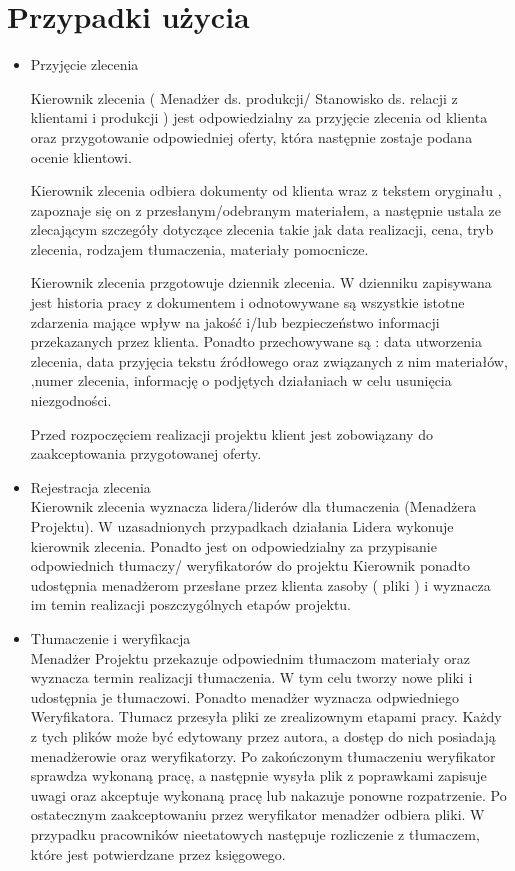 \documentclass[licencjacka]{pracamgr}
\begin{document}
\section{Przypadki użycia}
\begin{itemize} 
\item Przyjęcie zlecenia

Kierownik zlecenia ( Menadżer ds. produkcji/ Stanowisko ds. relacji z klientami i produkcji ) 
jest odpowiedzialny za przyjęcie zlecenia od klienta oraz przygotowanie odpowiedniej oferty, 
która następnie zostaje podana ocenie klientowi.


Kierownik zlecenia odbiera dokumenty od klienta wraz z tekstem oryginału , zapoznaje się on z przesłanym/odebranym materiałem,
a następnie ustala ze zlecającym szczegóły dotyczące zlecenia takie jak data realizacji, cena,  tryb zlecenia, rodzajem tłumaczenia,  
materiały pomocnicze.



Kierownik zlecenia przgotowuje dziennik zlecenia. W dzienniku zapisywana jest historia pracy z dokumentem i 
odnotowywane są wszystkie istotne zdarzenia mające wpływ na jakość i/lub bezpieczeństwo informacji przekazanych przez klienta. 
Ponadto przechowywane są : data utworzenia zlecenia, data przyjęcia tekstu źródłowego oraz związanych z nim materiałów,
,numer zlecenia, informację o podjętych działaniach w celu usunięcia niezgodności. 

Przed rozpoczęciem realizacji projektu klient jest zobowiązany do zaakceptowania przygotowanej oferty.

\item Rejestracja zlecenia \\
Kierownik zlecenia wyznacza lidera/liderów dla tłumaczenia (Menadżera Projektu). W uzasadnionych przypadkach działania Lidera wykonuje kierownik zlecenia.
Ponadto jest on odpowiedzialny za przypisanie odpowiednich tłumaczy/ weryfikatorów do projektu
Kierownik ponadto udostępnia menadżerom przesłane przez klienta zasoby ( pliki ) i wyznacza im temin realizacji poszczygólnych etapów projektu.

\item Tłumaczenie i weryfikacja\\
Menadżer Projektu przekazuje odpowiednim tłumaczom materiały oraz wyznacza termin realizacji tłumaczenia.
W tym celu tworzy nowe pliki i udostępnia je tłumaczowi.
Ponadto menadżer wyznacza odpwiedniego Weryfikatora.
Tłumacz przesyła pliki ze zrealizownym etapami pracy. Każdy z tych plików może być edytowany przez autora, a dostęp do nich posiadają menadżerowie oraz weryfikatorzy.
Po zakończonym tłumaczeniu weryfikator sprawdza wykonaną pracę, a następnie wysyła plik z poprawkami zapisuje uwagi oraz akceptuje wykonaną pracę lub nakazuje ponowne rozpatrzenie.
Po ostatecznym zaakceptowaniu przez weryfikator menadżer odbiera pliki.
W przypadku pracowników nieetatowych następuje rozliczenie z tłumaczem, które jest potwierdzane przez księgowego.


\end{itemize}
\end{document}
